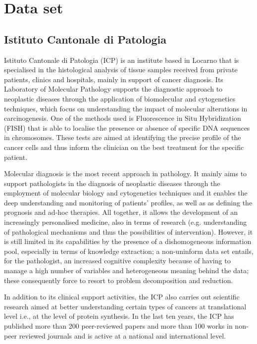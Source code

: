 \section{Data set} \label{sec:data-set}

\subsection{Istituto Cantonale di Patologia} \label{subsec:istituto-cantonale}
Istituto Cantonale di Patologia (ICP) is an institute based in Locarno that is specialised in the histological analysis of tissue samples received from private patients, clinics and hospitals, mainly in support of cancer diagnosis.
Its Laboratory of Molecular Pathology supports the diagnostic approach to neoplastic diseases through the application of biomolecular and cytogenetics techniques, which focus on understanding the impact of molecular alterations in carcinogenesis.
One of the methods used is Fluorescence in Situ Hybridization (FISH) that is able to localise the presence or absence of specific DNA sequences in chromosomes.
These tests are aimed at identifying the precise profile of the cancer cells and thus inform the clinician on the best treatment for the specific patient.

Molecular diagnosis is the most recent approach in pathology. It mainly aims to support pathologists in the diagnosis of neoplastic diseases through the employment of molecular biology and cytogenetics techniques and it enables the deep understanding and monitoring of patients' profiles, as well as as defining the prognosis and ad-hoc therapies. All together, it allows the development of an increasingly personalised medicine, also in terms of research (e.g. understanding of pathological mechanisms and thus the possibilities of intervention).
However, it is still limited in its capabilities by the presence of a dishomogeneous information pool, especially in terms of knowledge extraction; a non-uninform data set entails, for the pathologist, an increased cognitive complexity because of having to manage a high number of variables and heterogeneous meaning behind the data; these consequently force to resort to problem decomposition and reduction.

In addition to its clinical support activities, the ICP also carries out scientific research aimed at better understanding certain types of cancers at translational level i.e., at the level of protein synthesis.
In the last ten years, the ICP has published more than 200 peer-reviewed papers and more than 100 works in non-peer reviewed journals and is active at a national and international level.

